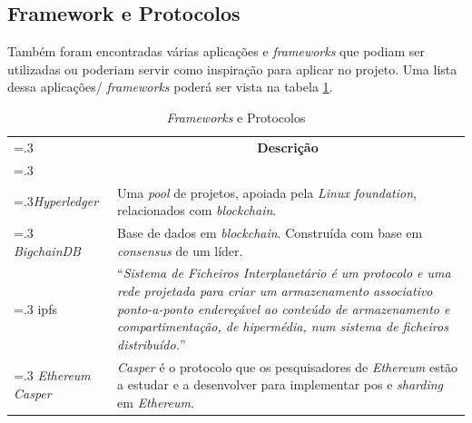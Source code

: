\subsection{Framework e Protocolos}

Também foram encontradas várias aplicações e \textit{frameworks} que podiam ser utilizadas ou poderiam servir como inspiração para aplicar no projeto. Uma lista dessa aplicações/ \textit{frameworks} poderá ser vista na tabela \ref{table:frameworks}.

\begin{table}[h!]
  \centering
  \begin{tabularx}{\linewidth}{>{\hsize=.3\hsize}lX}
    \multicolumn{1}{c}{\textbf{Nome}} & 
    \multicolumn{1}{c}{\textbf{Descrição}}
    \tabularnewline \tabularnewline 
    \textit{Hyperledger}&
    Uma \textit{pool} de projetos, apoiada pela \textit{Linux foundation}, relacionados com \textit{blockchain}. \cite{hyperledger}
    \tabularnewline \midrule
    \textit{BigchainDB}&
    Base de dados em \textit{blockchain}. Construída com base em \textit{consensus} de um líder. \cite{bigchaindb}
    \tabularnewline \midrule
    \acrfull{ipfs}&
    ``\textit{Sistema de Ficheiros Interplanetário é um protocolo e uma rede projetada para criar um armazenamento associativo ponto-a-ponto endereçável ao conteúdo de armazenamento e compartimentação, de hipermédia, num sistema de ficheiros distribuído.}'' \cite{ipfs_wiki}
    \tabularnewline \midrule
    \textit{Ethereum Casper}&
    \textit{Casper} é o protocolo que os pesquisadores de \textit{Ethereum} estão a estudar e a desenvolver para implementar \acrshort{pos} e \textit{sharding} em \textit{Ethereum}. \cite{ethereum_casper}
    \tabularnewline \midrule
    \end{tabularx}
  \caption{\textit{Frameworks} e Protocolos}
  \label{table:frameworks}
\end{table}
